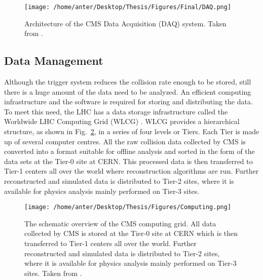 \begin{figure}[!h]
\begin{center}
\vspace*{1mm} 
\hspace*{-5mm}
\texttt{[image: /home/anter/Desktop/Thesis/Figures/Final/DAQ.png]}\\
\vspace*{2mm}
\caption[Architecture of the CMS Data Acquisition (DAQ) system.]{Architecture of the CMS Data Acquisition (DAQ) system. Taken from \cite{Chatrchyan:2008aa}.}
\label{fig:DAQ}
\end{center}
\end{figure}

\subsection{Data Management}
Although the trigger system reduces the collision rate enough to be stored, still there is a huge amount of the data need to be analyzed. An efficient computing infrastructure and the software is required for storing and distributing the data. To meet this need, the LHC has a data storage infrastructure called the Worldwide LHC Computing Grid (WLCG) \cite{Bird:2005js}. WLCG provides a hierarchical structure, as shown in Fig.~\ref{fig:Computing}, in a series of four levels or Tiers. Each Tier is made up of several computer centres. All the raw collision data collected by CMS is converted into a format suitable for offline analysis and sorted in the form of the data sets at the Tier-0 site at CERN. This processed data is then transferred to Tier-1 centers all over the world where reconstruction algorithms are run. Further reconstructed and simulated data is distributed to Tier-2 sites, where it is available for physics analysis mainly performed on Tier-3 sites. %

\begin{figure}[!h]
\begin{center}
\vspace*{3mm} 
\hspace*{-5mm}
\texttt{[image: /home/anter/Desktop/Thesis/Figures/Computing.png]}\\
\vspace*{4mm}
\caption[The schematic overview of the CMS computing grid.]{The schematic overview of the CMS computing grid. All data collected by CMS is stored at the Tier-0 site at CERN which is then transferred to Tier-1 centers all over the world. Further reconstructed and simulated data is distributed to Tier-2 sites, where it is available for physics analysis mainly performed on Tier-3 sites. Taken from \cite{Bird:2005js}.}
\label{fig:Computing}
\end{center}
\end{figure}

